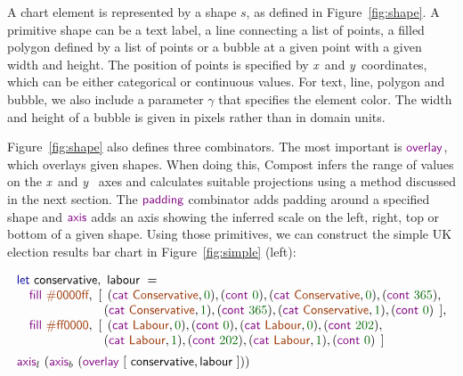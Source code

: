 \documentclass{jfp}
\newcommand{\X}{\emph{x}\ }
\newcommand{\Y}{\emph{y}\ }
\newcommand{\num}[1]{\textcolor{numclr}{#1}}
\newcommand{\strf}[1]{\textnormal{\textcolor{strclr}{\sffamily #1}}}
\newcommand{\ident}[1]{\textnormal{\textcolor{idclr}{\sffamily #1}}}
\newcommand{\kvd}[1]{\textnormal{\textcolor{kvdclr}{\sffamily #1}}}
\newcommand{\fkvd}[1]{\textnormal{\textcolor{fkvdclr}{\sffamily #1}}}
\begin{document}
A chart element is represented by a shape $s$, as defined in Figure~\ref{fig:shape}.
A primitive shape can be a text label, a line connecting a list of points, a filled polygon
defined by a list of points or a bubble at a given point with a given width and height.
The position of points is specified by \X and \Y coordinates, which can be either categorical or
continuous values. For text, line, polygon and bubble, we also include a parameter $\gamma$
that specifies the element color. The width and height of a bubble is given in pixels rather than
in domain units.

Figure~\ref{fig:shape} also defines three combinators. The most important is $\kvd{overlay}$,
which overlays given shapes. When doing this, Compost infers the range of values on the \X and \Y
axes and calculates suitable projections using a method discussed in the next
section. The $\kvd{padding}$ combinator adds padding around a specified shape and $\kvd{axis}$ adds
an axis showing the inferred scale on the left, right, top or bottom of a given shape.
Using those primitives, we can construct the simple UK election results bar chart in Figure~\ref{fig:simple} (left):

\begin{equation*}
\begin{array}{l}
\fkvd{let}~\ident{conservative},~\ident{labour}~=\\
\quad \kvd{fill}~\strf{\#0000ff},
 ~[\;\,(\kvd{cat}~\strf{Conservative}, \num{0}), (\kvd{cont}~\num{0}), (\kvd{cat}~\strf{Conservative}, \num{0}), (\kvd{cont}~\num{365}),\\
\hspace{6.7em}\;(\kvd{cat}~\strf{Conservative}, \num{1}), (\kvd{cont}~\num{365}), (\kvd{cat}~\strf{Conservative}, \num{1}), (\kvd{cont}~\num{0})\;\,],\\
\quad \kvd{fill}~\strf{\#ff0000},
 ~[\;\,(\kvd{cat}~\strf{Labour}, \num{0}), (\kvd{cont}~\num{0}), (\kvd{cat}~\strf{Labour}, \num{0}), (\kvd{cont}~\num{202}),\\
\hspace{6.7em}\;(\kvd{cat}~\strf{Labour}, \num{1}), (\kvd{cont}~\num{202}), (\kvd{cat}~\strf{Labour}, \num{1}), (\kvd{cont}~\num{0})\,\;]\\[0.5em]
\kvd{axis}_l~(\kvd{axis}_b~(\kvd{overlay}~[~\ident{conservative}, \ident{labour}~]))\\
\end{array}
\end{equation*}
\end{document}
